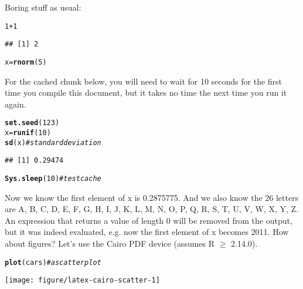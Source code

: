 \documentclass{article}\usepackage[]{graphicx}\usepackage[]{color}
\makeatletter
\newcommand{\hlnum}[1]{\textcolor[rgb]{0.686,0.059,0.569}{#1}}%
\newcommand{\hlcom}[1]{\textcolor[rgb]{0.678,0.584,0.686}{\textit{#1}}}%
\newcommand{\hlopt}[1]{\textcolor[rgb]{0,0,0}{#1}}%
\newcommand{\hlstd}[1]{\textcolor[rgb]{0.345,0.345,0.345}{#1}}%
\newcommand{\hlkwb}[1]{\textcolor[rgb]{0.69,0.353,0.396}{#1}}%
\newcommand{\hlkwd}[1]{\textcolor[rgb]{0.737,0.353,0.396}{\textbf{#1}}}%
\newenvironment{kframe}{%
 \def\at@end@of@kframe{}%
 \ifinner\ifhmode%
  \def\at@end@of@kframe{\end{minipage}}%
  \begin{minipage}{\columnwidth}%
 \fi\fi%
 \def\FrameCommand##1{\hskip\@totalleftmargin \hskip-\fboxsep
 \colorbox{shadecolor}{##1}\hskip-\fboxsep
     \hskip-\linewidth \hskip-\@totalleftmargin \hskip\columnwidth}%
 \MakeFramed {\advance\hsize-\width
   \@totalleftmargin\z@ \linewidth\hsize
   \@setminipage}}%
 {\par\unskip\endMakeFramed%
 \at@end@of@kframe}
\newenvironment{knitrout}{}{} %
\makeatother
\begin{document}
Boring stuff as usual:
\begin{knitrout}
\color{fgcolor}\begin{kframe}
\begin{alltt}
 \hlnum{1}\hlopt{+}\hlnum{1}
\end{alltt}
\begin{verbatim}
## [1] 2
\end{verbatim}
\begin{alltt}
 \hlstd{x}\hlkwb{=}\hlkwd{rnorm}\hlstd{(}\hlnum{5}\hlstd{)}
\end{alltt}
\end{kframe}
\end{knitrout}
For the cached chunk below, you will need to wait for 10 seconds for
the first time you compile this document, but it takes no time the
next time you run it again.
\begin{knitrout}
\color{fgcolor}\begin{kframe}
\begin{alltt}
 \hlkwd{set.seed}\hlstd{(}\hlnum{123}\hlstd{)}
 \hlstd{x} \hlkwb{=} \hlkwd{runif}\hlstd{(}\hlnum{10}\hlstd{)}
 \hlkwd{sd}\hlstd{(x)} \hlcom{# standard deviation}
\end{alltt}
\begin{verbatim}
## [1] 0.29474
\end{verbatim}
\begin{alltt}
 \hlkwd{Sys.sleep}\hlstd{(}\hlnum{10}\hlstd{)} \hlcom{# test cache}
\end{alltt}
\end{kframe}
\end{knitrout}
Now we know the first element of x is 0.2875775. And we also know
the 26 letters are A, B, C, D, E, F, G, H, I, J, K, L, M, N, O, P, Q, R, S, T, U, V, W, X, Y, Z. An expression that returns a
value of length 0 will be removed from the output,  but it was indeed evaluated, e.g. now the first element
of x becomes 2011.
How about figures? Let's use the Cairo PDF device (assumes R $\geq$
2.14.0).
\begin{knitrout}
\color{fgcolor}\begin{kframe}
\begin{alltt}
 \hlkwd{plot}\hlstd{(cars)} \hlcom{# a scatter plot}
\end{alltt}
\end{kframe}
\texttt{[image: figure/latex-cairo-scatter-1]} 

\end{knitrout}
\end{document}
